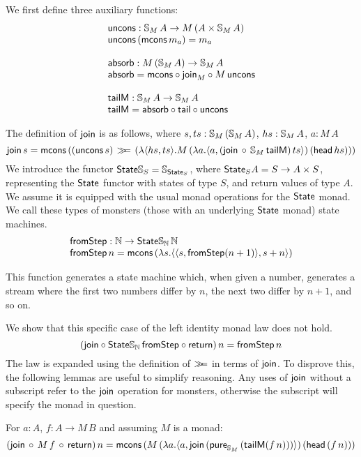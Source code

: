 We first define three auxiliary functions:
$$
\begin{array}{l}
\mathsf{uncons} : \mathbb{S}_{M}\,A \rightarrow M\,(A \times \mathbb{S}_{M}\,A)\\
\mathsf{uncons}\, (\mathsf{mcons}\, m_a) = m_a \\
\,\\
\mathsf{absorb} : M\,(\mathbb{S}_{M}\,A) \rightarrow \mathbb{S}_{M}\,A \\
\mathsf{absorb} =  \mathsf{mcons} \circ \mathsf{join}_{M} \circ M\,\mathsf{uncons} \\
\,\\
\mathsf{tailM} : \mathbb{S}_{M}\,A \rightarrow \mathbb{S}_{M}\,A \\
\mathsf{tailM} = \mathsf{absorb} \circ \mathsf{tail} \circ \mathsf{uncons}
\end{array}
$$

The definition of $\mathsf{join}$ is as follows, where $s, ts : \mathbb{S}_{M}\,(\mathbb{S}_{M}\, A)$, 
$hs : \mathbb{S}_{M}\, A$, $a : M\, A$
$$
\mathsf{join}\, s = \mathsf{mcons}\, ((\mathsf{uncons}\, s) \, \mathbin{\gg\!\!=} \,(\lambda \langle hs, ts \rangle . M\,(\lambda a . \langle a, (\mathsf{join}\, \circ\, \mathbb{S}_{M}\,\mathsf{tailM})\, ts \rangle)\, (\mathsf{head}\, hs)))
$$
We introduce the functor $\mathsf{State}\mathbb{S}_{S} = \mathbb{S}_{\mathsf{State}_S}$, where $\mathsf{State}_S A = S \rightarrow A \times S$, representing the $\mathsf{State}$ functor with states of type $S$, and return values of type $A$. We assume it is equipped with the usual monad operations for the $\mathsf{State}$ monad. We call these types of monsters (those with an underlying $\mathsf{State}$ monad) state machines.
$$
\begin{array}{l}
\mathsf{fromStep} : \mathbb{N} \rightarrow \mathsf{State}\mathbb{S}_{\mathbb{N}}\,\mathbb{N} \\
\mathsf{fromStep}\, n = \mathsf{mcons}\, (\lambda s. \langle \langle s, \mathsf{fromStep} (n + 1) \rangle, s + n \rangle)
\end{array}
$$

This function generates a state machine which, when given a number, generates a stream where the first two numbers differ by $n$, the next two differ by $n + 1$, and so on.

We show that this specific case of the left identity monad law does not hold. 
$$
(\mathsf{join} \circ \mathsf{State}\mathbb{S}_{\mathbb{N}}\, \mathsf{fromStep} \circ \mathsf{return})\, n = \mathsf{fromStep}\, n
$$
The law is expanded using the definition of $\mathbin{\gg\!\!=}$ in terms of $\mathsf{join}$. 
To disprove this, the following lemmas are useful to simplify reasoning. Any uses of $\mathsf{join}$ without a subscript refer to the $\mathsf{join}$ operation for monsters, otherwise the subscript will specify the monad in question.

\begin{lemma}\label{lemma:general_bind_law}
For $a : A$, $f : A \rightarrow M\, B$ and assuming $M$ is a monad:
$$
(\mathsf{join}\, \circ\,  M\, f\, \circ\, \mathsf{return})\, n = \mathsf{mcons}\, (M\,(\lambda a . \langle a, \mathsf{join}\, (\mathsf{pure}_{\mathbb{S}_{M}}\, (\mathsf{tailM} (f\, n))) \rangle)\, (\mathsf{head}\, (f\, n)))
$$
\end{lemma}

